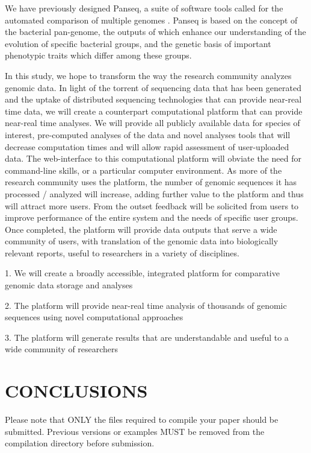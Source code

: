 \documentclass[a4paper,twoside]{article}
\begin{document}
We have previously designed Panseq, a suite of software tools called for the automated comparison of multiple genomes \cite{laing_pan-genome_2010,laing_identification_2011}. Panseq is based on the concept of the bacterial pan-genome, the outputs of which enhance our understanding of the evolution of specific bacterial groups, and the genetic basis of important phenotypic traits which differ among these groups.

In this study, we hope to transform the way the research community analyzes genomic data. In light of the torrent of sequencing data that has been generated and the uptake of distributed sequencing technologies that can provide near-real time data, we will create a counterpart computational platform that can provide near-real time analyses. We will provide all publicly available data for species of interest, pre-computed analyses of the data and novel analyses tools that will decrease computation times and will allow rapid assessment of user-uploaded data. The web-interface to this computational platform will obviate the need for command-line skills, or a particular computer environment. As more of the research community uses the platform, the number of genomic sequences it has processed / analyzed will increase, adding further value to the platform and thus will attract more users. From the outset feedback will be solicited from users to improve performance of the entire system and the needs of specific user groups.   Once completed, the platform will provide data outputs that serve a wide community of users, with translation of the genomic data into biologically relevant reports, useful to researchers in a variety of disciplines.


1. We will create a broadly accessible, integrated platform for comparative genomic data storage and analyses

2. The platform will provide near-real time analysis of thousands of genomic sequences using novel computational approaches

3. The platform will generate results that are understandable and useful to a wide community of researchers

\section{\uppercase{Conclusions}}
\label{sec:conclusion}

\noindent Please note that ONLY the files required to compile your paper should be submitted. Previous versions or examples MUST be removed from the compilation directory before submission.
\end{document}
